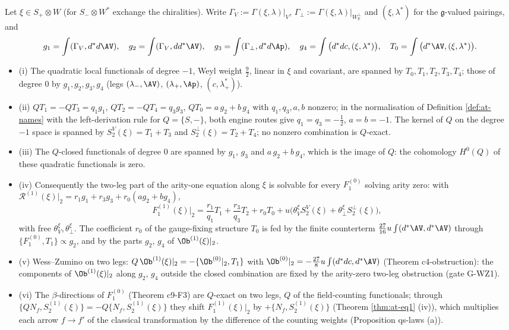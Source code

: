 \begin{proposition}
\label{prop:at-xi2}
Let $\xi\in S_+\otimes W$ (for $S_-\otimes W^*$ exchange the chiralities). Write $\Gamma_V:=\Gamma(\xi,\lambda)|_V$, $\Gamma_\perp:=\Gamma(\xi,\lambda)|_{W^\perp_{\mathbb R}}$ and $(\xi,\lambda^*)$ for the $\mathfrak g$-valued pairings, and
\[
g_1=\int(\Gamma_V,d^*d\AV),\quad g_2=\int(\Gamma_V,dd^*\AV),\quad g_3=\int(\Gamma_\perp,d^*d\Ap),\quad g_4=\int\big(d^*dc,(\xi,\lambda^*)\big),\quad T_0=\int\big(d^*\AV,(\xi,\lambda^*)\big).
\]
\begin{itemize}
\item (i) The quadratic local functionals of degree $-1$, Weyl weight $\tfrac92$, linear in $\xi$ and covariant, are spanned by $T_0,T_1,T_2,T_3,T_4$; those of degree $0$ by $g_1,g_2,g_3,g_4$ (legs $(\lambda_-,\AV)$, $(\lambda_+,\Ap)$, $(c,\lambda^*_+)$).
\item (ii) $QT_1=-QT_3=q_1g_1$, $QT_2=-QT_4=q_3g_3$, $QT_0=a\,g_2+b\,g_4$ with $q_1,q_3,a,b$ nonzero; in the normalisation of Definition \ref{def:at-names} with the left-derivation rule for $Q=\{S,-\}$, both engine routes give $q_1=q_3=-\tfrac12$, $a=b=-1$. The kernel of $Q$ on the degree $-1$ space is spanned by $S^V_2(\xi)=T_1+T_3$ and $S^\perp_2(\xi)=T_2+T_4$; no nonzero combination is $Q$-exact.
\item (iii) The $Q$-closed functionals of degree $0$ are spanned by $g_1$, $g_3$ and $a\,g_2+b\,g_4$, which is the image of $Q$: the cohomology $H^0(Q)$ of these quadratic functionals is zero.
\item (iv) Consequently the two-leg part of the arity-one equation along $\xi$ is solvable for every $F_1^{(0)}$ solving arity zero: with $\mathcal R^{(1)}(\xi)|_2=r_1g_1+r_3g_3+r_0(ag_2+bg_4)$,
\[
F_1^{(1)}(\xi)|_2=\frac{r_1}{q_1}T_1+\frac{r_3}{q_3}T_2+r_0T_0+u\big(\theta^\xi_VS^V_2(\xi)+\theta^\xi_\perp S^\perp_2(\xi)\big),
\]
with free $\theta^\xi_V,\theta^\xi_\perp$. The coefficient $r_0$ of the gauge-fixing structure $T_0$ is fed by the finite counterterm $\tfrac{27}{16}u\int(d^*\AV,d^*\AV)$ through $\{F_1^{(0)},T_1\}\propto g_2$, and by the parts $g_2$, $g_4$ of $\Ob^{(1)}(\xi)|_2$.
\item (v) Wess--Zumino on two legs: $Q\,\Ob^{(1)}(\xi)|_2=-\{\Ob^{(0)}|_2,T_1\}$ with $\Ob^{(0)}|_2=-\tfrac{27}8u\int(d^*dc,d^*\AV)$ (Theorem c4-obstruction): the components of $\Ob^{(1)}(\xi)|_2$ along $g_2$, $g_4$ outside the closed combination are fixed by the arity-zero two-leg obstruction (gate G-WZ1).
\item (vi) The $\beta$-directions of $F_1^{(0)}$ (Theorem c9-F3) are $Q$-exact on two legs, $Q$ of the field-counting functionals; through $\{Q N_f,S^{(1)}_2(\xi)\}=-Q\{N_f,S^{(1)}_2(\xi)\}$ they shift $F_1^{(1)}(\xi)|_2$ by $+\{N_f,S^{(1)}_2(\xi)\}$ (Theorem \ref{thm:at-eq1} (iv)), which multiplies each arrow $f\to f'$ of the classical transformation by the difference of the counting weights (Proposition qs-laws (a)).
\end{itemize}
\end{proposition}

